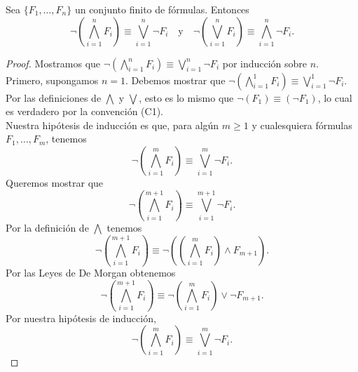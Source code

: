 \documentclass[12pt,a4paper]{book}
\begin{document}
    \begin{proposicion}\label{prop:demorgan-generalizado}
        Sea $\{F_{1},\dots,F_{n}\}$ un conjunto finito de fórmulas. Entonces
        \begin{equation*}
            \neg\left(\bigwedge_{i=1}^{n}F_{i}\right)\equiv\bigvee_{i=1}^{n}\neg F_{i}\quad\text{y}\quad
            \neg\left(\bigvee_{i=1}^{n}F_{i}\right)\equiv\bigwedge_{i=1}^{n}\neg F_{i}.
        \end{equation*}
    \end{proposicion}
    \begin{proof}
        Mostramos que $\neg\left(\bigwedge_{i=1}^{n}F_{i}\right)\equiv\bigvee_{i=1}^{n}\neg F_{i}$ por inducción sobre $n$.\\
        Primero, supongamos $n=1$. Debemos mostrar que $\neg\left(\bigwedge_{i=1}^{1}F_{i}\right)\equiv\bigvee_{i=1}^{1}\neg F_{i}$.
        Por las definiciones de $\bigwedge$ y $\bigvee$, esto es lo mismo que $\neg(F_{1})\equiv(\neg F_{1})$, lo cual es
        verdadero por la convención (C1).\\
        Nuestra hipótesis de inducción es que, para algún $m\geq 1$ y cualesquiera fórmulas $F_{1},\dots,F_{m}$, tenemos
        \begin{equation*}
            \neg\left(\bigwedge_{i=1}^{m}F_{i}\right)\equiv\bigvee_{i=1}^{m}\neg F_{i}.
        \end{equation*}
        Queremos mostrar que
        \begin{equation*}
            \neg\left(\bigwedge_{i=1}^{m+1}F_{i}\right)\equiv\bigvee_{i=1}^{m+1}\neg F_{i}.
        \end{equation*}
        Por la definición de $\bigwedge$ tenemos
        \begin{equation*}
            \neg\left(\bigwedge_{i=1}^{m+1}F_{i}\right)\equiv\neg\left(\left(\bigwedge_{i=1}^{m}F_{i}\right)\wedge F_{m+1}\right).
        \end{equation*}
        Por las Leyes de De Morgan obtenemos
        \begin{equation}\label{eq:demorgan-gen-1}
            \neg\left(\bigwedge_{i=1}^{m+1}F_{i}\right)\equiv\neg\left(\bigwedge_{i=1}^{m}F_{i}\right)\vee\neg F_{m+1}.
        \end{equation}
        Por nuestra hipótesis de inducción,
        \begin{equation*}
            \neg\left(\bigwedge_{i=1}^{m}F_{i}\right)\equiv\bigvee_{i=1}^{m}\neg F_{i}.
        \end{equation*}

\end{proof}
\end{document}
